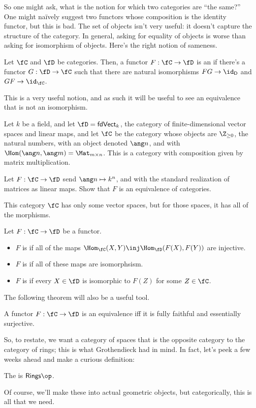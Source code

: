 So one might ask, what is the notion for which two categories are ``the same?'' One might naïvely suggest two
functors whose composition is the identity functor, but this is bad. The set of objects isn't very useful: it
doesn't capture the structure of the category. In general, asking for equality of objects is worse than asking for
isomorphism of objects. Here's the right notion of sameness.
\begin{defn}
Let \(\fC\) and \(\fD\) be categories. Then, a functor \(F:\fC\to\fD\) is an  if there's a functor \(G:\fD\to\fC\) such that there are natural isomorphisms \(FG\to\id_{\mathsf
D}\) and \(GF\to\id_{\fC}\).
\end{defn}
This is a very useful notion, and as such it will be useful to see an equivalence that is not an isomorphism.
\begin{ex}
Let \(k\) be a field, and let \(\fD = \mathsf{fdVect}_k\), the category of finite-dimensional vector spaces
and linear maps, and let \(\fC\) be the category whose objects are \(\Z_{\ge 0}\), the natural numbers, with an
object denoted \(\ang n\), and with \(\Hom(\ang n,\ang m) = \Mat_{m\times n}\). This is a category with composition
given by matrix multiplication.

Let \(F:\fC\to\fD\) send \(\ang n\mapsto k^n\), and with the standard realization of matrices as linear maps.
Show that \(F\) is an equivalence of categories.
\end{ex}
This category \(\fC\) has only some vector spaces, but for those spaces, it has all of the morphisms.
\begin{defn}
Let \(F:\fC\to\fD\) be a functor.
\begin{itemize}
	\item \(F\) is  if all of the maps \(\Hom_\fC(X,Y)\inj \Hom_\fD(F(X),F(Y))\) are injective.
	\item \(F\) is  if all of these maps are isomorphsism.
	\item \(F\) is  if every \(X\in\fD\) is isomorphic to \(F(Z)\) for some
	\(Z\in\fC\).
\end{itemize}
\end{defn}
The following theorem will also be a useful tool.
\begin{thm}
A functor \(F:\fC\to\fD\) is an equivalence iff it is fully faithful and essentially surjective.
\end{thm}
So, to restate, we want a category of spaces that is the opposite category to the category of rings; this is what
Grothendieck had in mind. In fact, let's peek a few weeks ahead and make a curious definition:
\begin{defn}
The  is \(\mathsf{Rings}\op\).
\end{defn}
Of course, we'll make these into actual geometric objects, but categorically, this is all that we need.

